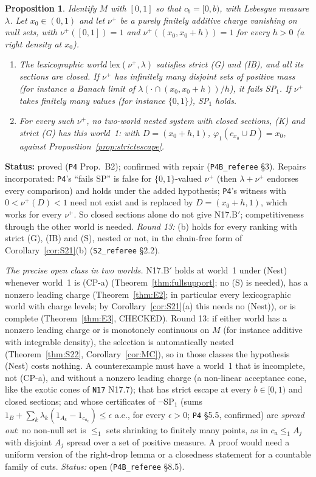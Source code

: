 \documentclass[11pt]{article}
\newtheorem{proposition}[theorem]{Proposition}
\theoremstyle{definition}
\theoremstyle{remark}
\newcommand{\src}[1]{\texttt{#1}}
\newcommand{\status}[1]{\par\smallskip\noindent\textbf{Status:} #1\par\smallskip}
\begin{document}
\begin{proposition}\label{prop:B2}
Identify $M$ with $[0,1]$ so that $c_b=[0,b)$, with Lebesgue measure $\lambda$. Let $x_0\in(0,1)$ and let $\nu^+$ be a purely finitely additive charge vanishing on null sets, with $\nu^+([0,1])=1$ and $\nu^+((x_0,x_0+h))=1$ for every $h>0$ (a right density at $x_0$).
\begin{enumerate}[leftmargin=*,label=(\alph*)]
\item The lexicographic world $\mathrm{lex}(\nu^+,\lambda)$ satisfies strict (G) and (IB), and all its sections are closed. If $\nu^+$ has infinitely many disjoint sets of positive mass (for instance a Banach limit of $\lambda(\cdot\cap(x_0,x_0+h))/h$), it fails SP$_1$. If $\nu^+$ takes finitely many values (for instance $\{0,1\}$), SP$_1$ holds.
\item For every such $\nu^+$, no two-world nested system with closed sections, (K) and strict (G) has this world~1: with $D=(x_0+h,1)$, $\varphi_1(c_{x_0}\cup D)=x_0$, against Proposition~\ref{prop:strictescape}.
\end{enumerate}
\end{proposition}
\status{proved (\src{P4} Prop.~B2); confirmed with repair (\src{P4B\_referee} \S3). Repairs incorporated: \src{P4}'s ``fails SP'' is false for $\{0,1\}$-valued $\nu^+$ (then $\lambda+\nu^+$ endorses every comparison) and holds under the added hypothesis; \src{P4}'s witness with $0<\nu^+(D)<1$ need not exist and is replaced by $D=(x_0+h,1)$, which works for every $\nu^+$. So closed sections alone do not give N17.B$'$; competitiveness through the other world is needed. \emph{Round 13:} (b) holds for every ranking with strict (G), (IB) and (S), nested or not, in the chain-free form of Corollary~\ref{cor:S21}(b) (\src{S2\_referee} \S2.2).}

\emph{The precise open class in two worlds.} N17.B$'$ holds at world~1 under (Nest) whenever world~1 is (CP-a) (Theorem~\ref{thm:fullsupport}; no (S) is needed), has a nonzero leading charge (Theorem~\ref{thm:E2}; in particular every lexicographic world with charge levels; by Corollary~\ref{cor:S21}(a) this needs no (Nest)), or is complete (Theorem~\ref{thm:E3}, CHECKED). Round 13: if either world has a nonzero leading charge or is monotonely continuous on $M$ (for instance additive with integrable density), the selection is automatically nested (Theorem~\ref{thm:S22}, Corollary~\ref{cor:MC}), so in those classes the hypothesis (Nest) costs nothing. A counterexample must have a world~1 that is incomplete, not (CP-a), and without a nonzero leading charge (a non-linear acceptance cone, like the exotic cones of \src{N17} N17.7); that has strict escape at every $b\in[0,1)$ and closed sections; and whose certificates of $\neg$SP$_1$ (sums $1_B+\sum_k\lambda_k(1_{A_k}-1_{c_{a_k}})\le\epsilon$ a.e., for every $\epsilon>0$; \src{P4} \S5.5, confirmed) are \emph{spread out}: no non-null set is $\le_1$ sets shrinking to finitely many points, as in $c_a\le_1A_j$ with disjoint $A_j$ spread over a set of positive measure. A proof would need a uniform version of the right-drop lemma or a closedness statement for a countable family of cuts. \emph{Status:} open (\src{P4B\_referee} \S8.5).
\end{document}
